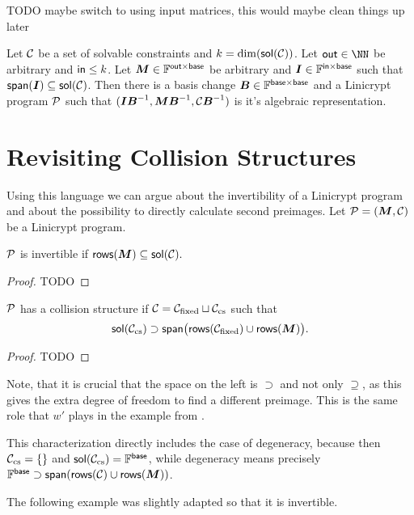TODO maybe switch to using input matrices, this would maybe clean things up later
\begin{lemma}
Let $\C$ be a set of solvable constraints and $k = \dim (\sol (\C))$.
Let $\out \in \NN$ be arbitrary and $\inp \leq k$.
Let $\M \in \F^{\out \times \base}$ be arbitrary and $\Inp \in \F^{\inp \times \base}$ such that $\spn(\Inp) \subseteq \sol(\C)$.
Then there is a basis change $\B \in \F^{\base \times \base}$ and a Linicrypt program $\P$
such that $(\Inp \B^{-1}, \M\B^{-1}, \C \B^{-1})$ is it's algebraic representation.
\end{lemma}

\section{Revisiting Collision Structures}
Using this language we can argue about the invertibility of a Linicrypt program and about the possibility to directly calculate second preimages.
Let $\P = (\M, \C)$ be a Linicrypt program.

\begin{lemma}
    $\P$ is invertible if $\rows(\M) \subseteq \sol(\C).$
\end{lemma}

\begin{proof}
TODO
\end{proof}

\begin{lemma}
    $\P$ has a collision structure
    if $\C = \C_{\textrm{fixed}} \sqcup \C_{\textrm{cs}}$ such that
    \begin{equation}
        \sol(\C_\textrm{cs}) \supset \spn\big(\rows(\C_\textrm{fixed}) \cup \rows(\M)\big).
    \end{equation}
\end{lemma}
\begin{proof}
TODO
\end{proof}

Note, that it is crucial that the space on the left is $\supset$ and not only $\supseteq$,
as this gives the extra degree of freedom to find a different preimage.
This is the same role that $w'$ plays in the example from \cite{RMS20}.

This characterization directly includes the case of degeneracy,
because then $\Ccs = \{\}$ and $\sol(\Ccs) = \Base$,
while degeneracy means precisely $\Base \supset \spn(\rows(\C) \cup \rows(\M))$.

The following example was slightly adapted so that it is invertible.

